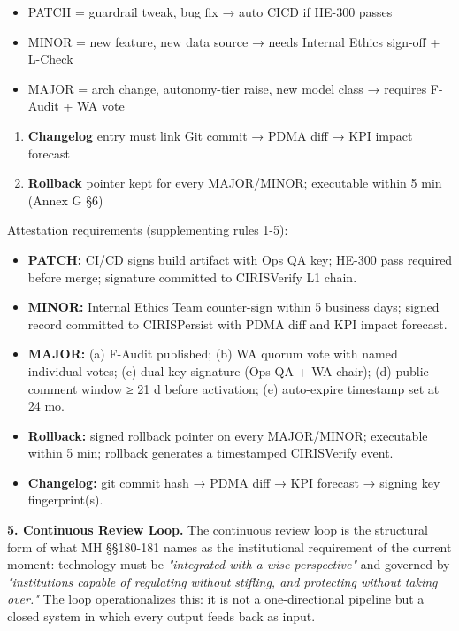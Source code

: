 \documentclass[11pt]{article}
\begin{document}
\begin{itemize}\setlength\itemsep{0pt}
\item PATCH = guardrail tweak, bug fix → auto CICD if HE-300 passes
\item MINOR = new feature, new data source → needs Internal Ethics sign-off + L-Check
\item MAJOR = arch change, autonomy-tier raise, new model class → requires F-Audit + WA vote
\end{itemize}

\begin{enumerate}\setlength\itemsep{0pt}
\item \textbf{Changelog} entry must link Git commit → PDMA diff → KPI impact forecast
\item \textbf{Rollback} pointer kept for every MAJOR/MINOR; executable within 5 min (Annex G §6)
\end{enumerate}


Attestation requirements (supplementing rules 1-5):


\begin{itemize}\setlength\itemsep{0pt}
\item \textbf{PATCH:} CI/CD signs build artifact with Ops QA key; HE-300 pass required before merge; signature committed to CIRISVerify L1 chain.
\item \textbf{MINOR:} Internal Ethics Team counter-sign within 5 business days; signed record committed to CIRISPersist with PDMA diff and KPI impact forecast.
\item \textbf{MAJOR:} (a) F-Audit published; (b) WA quorum vote with named individual votes; (c) dual-key signature (Ops QA + WA chair); (d) public comment window ≥ 21 d before activation; (e) auto-expire timestamp set at 24 mo.
\item \textbf{Rollback:} signed rollback pointer on every MAJOR/MINOR; executable within 5 min; rollback generates a timestamped CIRISVerify event.
\item \textbf{Changelog:} git commit hash → PDMA diff → KPI forecast → signing key fingerprint(s).
\end{itemize}


\textbf{5. Continuous Review Loop.} The continuous review loop is the structural form of what MH §§180-181 names as the institutional requirement of the current moment: technology must be \textit{"integrated with a wise perspective"} and governed by \textit{"institutions capable of regulating without stifling, and protecting without taking over."} The loop operationalizes this: it is not a one-directional pipeline but a closed system in which every output feeds back as input.
\end{document}
